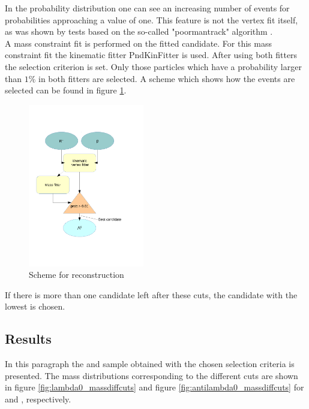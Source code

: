 		In the probability distribution one can see an increasing number of events for probabilities approaching a value of one.
		This feature is not the vertex fit itself, as was shown by tests based on the so-called "poormantrack" algorithm \cite{RalfKliemt}.
		\vspace{11pt}\\
		A mass constraint fit is performed on the fitted candidate.
		For this mass constraint fit the kinematic fitter PndKinFitter is used.
		After using both fitters the selection criterion is set. 
		Only those particles which have a probability larger than $1\%$ in both fitters are selected.
		A scheme which shows how the events are selected can be found in figure \ref{fig:lambda_scheme}. 
		
		\begin{figure}
			\centering
				\includegraphics[width=0.45\textwidth]{./plots/combineLambda0.pdf}
			\caption{\propose Scheme for \lam reconstruction}
			\label{fig:lambda_scheme}
		\end{figure}
		
		If there is more than one candidate left after these cuts, the candidate with the lowest \chisq is chosen.
		
		
	\subsection*{Results}
		In this paragraph the \lam and \alam sample obtained with the chosen selection criteria is presented.
		The mass distributions corresponding to the different cuts are shown in figure \ref{fig:lambda0_massdiffcuts} 
		and figure \ref{fig:antilambda0_massdiffcuts} for \lam and \alam, respectively.
	
